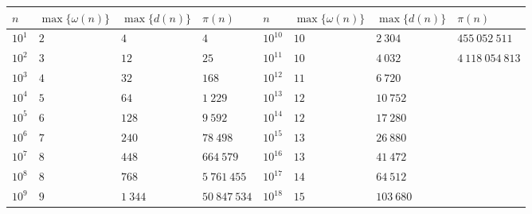 \begin{tabular}{llll|llll}
    \hline
    \(n\)    & \(\max\{\omega(n)\}\) & \(\max\{d(n)\}\) & \(\pi(n)\)     & \(n\)       & \(\max\{\omega(n)\}\) & \(\max\{d(n)\}\) & \(\pi(n)\)        \\
    \hline
    \(10^1\) & \(2\)                 & \(4\)            & \(4\)          & \(10^{10}\) & \(10\)                & \(2~304\)        & \(455~052~511\)   \\
    \(10^2\) & \(3\)                 & \(12\)           & \(25\)         & \(10^{11}\) & \(10\)                & \(4~032\)        & \(4~118~054~813\) \\
    \(10^3\) & \(4\)                 & \(32\)           & \(168\)        & \(10^{12}\) & \(11\)                & \(6~720\)        &                   \\
    \(10^4\) & \(5\)                 & \(64\)           & \(1~229\)      & \(10^{13}\) & \(12\)                & \(10~752\)       &                   \\
    \(10^5\) & \(6\)                 & \(128\)          & \(9~592\)      & \(10^{14}\) & \(12\)                & \(17~280\)       &                   \\
    \(10^6\) & \(7\)                 & \(240\)          & \(78~498\)     & \(10^{15}\) & \(13\)                & \(26~880\)       &                   \\
    \(10^7\) & \(8\)                 & \(448\)          & \(664~579\)    & \(10^{16}\) & \(13\)                & \(41~472\)       &                   \\
    \(10^8\) & \(8\)                 & \(768\)          & \(5~761~455\)  & \(10^{17}\) & \(14\)                & \(64~512\)       &                   \\
    \(10^9\) & \(9\)                 & \(1~344\)        & \(50~847~534\) & \(10^{18}\) & \(15\)                & \(103~680\)      &                   \\
    \hline
\end{tabular}
